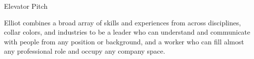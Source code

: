 \documentclass{resume} %
\begin{document}

\begin{rSection}{Elevator Pitch}

Elliot combines a broad array of skills and experiences from across disciplines, collar colors, and industries to be a leader who can understand and communicate with people from any position or background, and a worker who can fill almost any professional role and occupy any company space. \\

\end{rSection}

\end{document}
